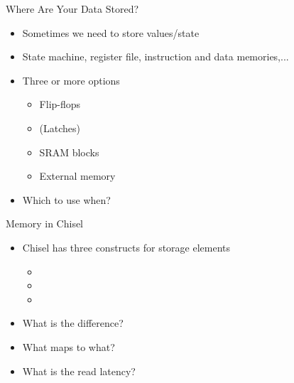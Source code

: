 


\begin{frame}[fragile]{Where Are Your Data Stored?}
\begin{itemize}
\item Sometimes we need to store values/state
\item State machine, register file, instruction and data memories,...
\item Three or more options
\begin{itemize}
\item Flip-flops
\item (Latches)
\item SRAM blocks
\item External memory
\end{itemize}
\item Which to use when?
\end{itemize}
\end{frame}

\begin{frame}[fragile]{Memory in Chisel}
\begin{itemize}
\item Chisel has three constructs for storage elements
\begin{itemize}
\item {}
\item {}
\item {}
\end{itemize}
\item What is the difference?
\item What maps to what?
\item What is the read latency?
\end{itemize}
\end{frame}

